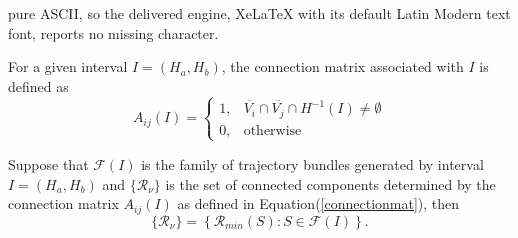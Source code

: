 \documentclass[10pt,a4paper]{amsart}
\begin{document}
pure ASCII, so the delivered engine, XeLaTeX with its default Latin Modern text font, reports no missing character.
\begin{defi}
    For a given interval $I = (H_{a}, H_{b})$, the connection matrix associated with $I$ is defined as 
    \begin{equation}\label{connectionmat}
        A_{ij}(I)=\begin{cases}
1, & \overline{V_{i}}\cap\overline{V_{j}}\cap H^{-1}(I)\neq\emptyset\\
0, & \text{otherwise}
\end{cases}
    \end{equation}
\end{defi}

\begin{theorem}
    Suppose that $\mathcal{F}(I)$ is the family of trajectory bundles generated by interval $I=(H_{a}, H_{b})$ and $\{\mathcal{R}_{\nu} \}$ is the set of connected components determined by the connection matrix $A_{ij}(I)$ as defined in Equation(\ref{connectionmat}), then
    \begin{equation*}
        \{\mathcal{R}_{\nu}\}=\left\{ \mathcal{R}_{min}(S):S\in\mathcal{F}(I)\right\}. 
    \end{equation*}
\end{theorem}
\end{document}
